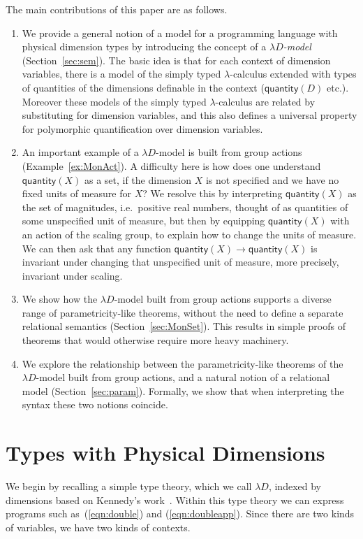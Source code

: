 \documentclass[a4paper,UKenglish]{lipics}
\newcommand{\msf}[1]{\mathsf{#1}} %
\newcommand{\qnt}{\msf{quantity}}
\newcommand{\Dvar}{X}
\begin{document}
The main contributions of this paper are as follows.
\begin{enumerate}
\item We provide a general notion of a model for a programming language with physical dimension types by introducing the concept of a \emph{$\lambda D$-model} (Section~\ref{sec:sem}). The basic idea is that for each context of dimension variables, there is a model of the simply typed $\lambda$-calculus extended with types of quantities of the dimensions definable in the context ($\qnt(D)$ etc.). Moreover these models of the simply typed $\lambda$-calculus are related by substituting for dimension variables, and this also defines a universal property for polymorphic quantification over dimension variables.

\item An important example of a $\lambda D$-model is built from group actions (Example~\ref{ex:MonAct}).
A difficulty here is how does one understand $\qnt(\Dvar)$ as a set, if the dimension $\Dvar$ is not specified and we have no fixed units of measure for $\Dvar$? We resolve this by interpreting $\qnt(\Dvar)$ as the set of magnitudes, i.e.~positive real numbers, thought of as quantities of some unspecified unit of measure, but then by equipping $\qnt(\Dvar)$ with an action of the scaling group, to explain how to change the units of measure. We can then ask that any function $\qnt(\Dvar)\to\qnt(\Dvar)$ is invariant under changing that unspecified unit of measure, more precisely, invariant under scaling.

\item We show how the $\lambda D$-model built from group actions supports a diverse range of parametricity-like theorems, without the need to define a separate relational semantics (Section~\ref{sec:MonSet}). This results in simple proofs of theorems that would otherwise require more heavy machinery.

\item We explore the relationship between the parametricity-like theorems of the $\lambda D$-model built from group actions, and a natural notion of a relational model (Section~\ref{sec:param}). Formally, we show that when interpreting the syntax these two notions coincide.
\end{enumerate}


\section{Types with Physical Dimensions}
\label{sec:Not}
We begin by recalling a simple type theory, which we call $\lambda D$, indexed by dimensions based on Kennedy's work~\cite{Kennedy:1997:RPU:263699.263761}. Within this type theory we can express programs such as~(\ref{eqn:double}) and (\ref{eqn:doubleapp}). Since there are two kinds of variables, we have two kinds of contexts.
\end{document}
